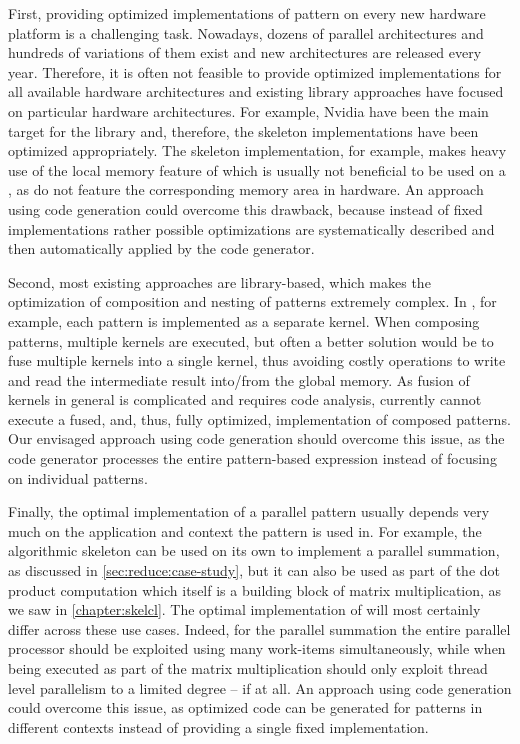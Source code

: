 First, providing optimized implementations of pattern on every new hardware platform is a challenging task.
Nowadays, dozens of parallel architectures and hundreds of variations of them exist and new architectures are released every year.
Therefore, it is often not feasible to provide optimized implementations for all available hardware architectures and existing library approaches have focused on particular hardware architectures.
For example, Nvidia \GPUs have been the main target for the \SkelCL library and, therefore, the skeleton implementations have been optimized appropriately.
The \stencil skeleton implementation, for example, makes heavy use of the local memory feature of \OpenCL which is usually not beneficial to be used on a \CPU, as \CPUs do not feature the corresponding memory area in hardware.
An approach using code generation could overcome this drawback, because instead of fixed implementations rather possible optimizations are systematically described and then automatically applied by the code generator.

Second, most existing approaches are library-based, which makes the optimization of composition and nesting of patterns extremely complex.
In \SkelCL, for example, each pattern is implemented as a separate \OpenCL kernel.
When composing patterns, multiple kernels are executed, but often a better solution would be to fuse multiple kernels into a single kernel, thus avoiding costly operations to write and read the intermediate result into/from the global memory.
As fusion of \OpenCL kernels in general is complicated and requires code analysis, \SkelCL currently cannot execute a fused, and, thus, fully optimized, implementation of composed patterns.
Our envisaged approach using code generation should overcome this issue, as the code generator processes the entire pattern-based expression instead of focusing on individual patterns.

Finally, the optimal implementation of a parallel pattern usually depends very much on the application and context the pattern is used in.
For example, the algorithmic skeleton \reduce can be used on its own to implement a parallel summation, as discussed in \autoref{sec:reduce:case-study}, but it can also be used as part of the dot product computation which itself is a building block of matrix multiplication, as we saw in \autoref{chapter:skelcl}.
The optimal implementation of \reduce will most certainly differ across these use cases.
Indeed, for the parallel summation the entire parallel processor should be exploited using many \OpenCL work-items simultaneously, while when being executed as part of the matrix multiplication \reduce should only exploit thread level parallelism to a limited degree -- if at all.
An approach using code generation could overcome this issue, as optimized code can be generated for patterns in different contexts instead of providing a single fixed implementation.

